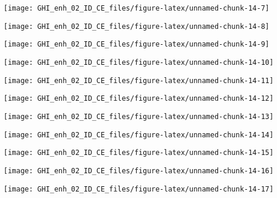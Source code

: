 \documentclass[
  10pt,
  a4paper,oneside]{article}
\begin{document}
\begin{center}\texttt{[image: GHI\_enh\_02\_ID\_CE\_files/figure-latex/unnamed-chunk-14-7]} \end{center}

\begin{center}\texttt{[image: GHI\_enh\_02\_ID\_CE\_files/figure-latex/unnamed-chunk-14-8]} \end{center}

\begin{center}\texttt{[image: GHI\_enh\_02\_ID\_CE\_files/figure-latex/unnamed-chunk-14-9]} \end{center}

\begin{center}\texttt{[image: GHI\_enh\_02\_ID\_CE\_files/figure-latex/unnamed-chunk-14-10]} \end{center}

\begin{center}\texttt{[image: GHI\_enh\_02\_ID\_CE\_files/figure-latex/unnamed-chunk-14-11]} \end{center}

\begin{center}\texttt{[image: GHI\_enh\_02\_ID\_CE\_files/figure-latex/unnamed-chunk-14-12]} \end{center}

\begin{center}\texttt{[image: GHI\_enh\_02\_ID\_CE\_files/figure-latex/unnamed-chunk-14-13]} \end{center}

\begin{center}\texttt{[image: GHI\_enh\_02\_ID\_CE\_files/figure-latex/unnamed-chunk-14-14]} \end{center}

\begin{center}\texttt{[image: GHI\_enh\_02\_ID\_CE\_files/figure-latex/unnamed-chunk-14-15]} \end{center}

\begin{center}\texttt{[image: GHI\_enh\_02\_ID\_CE\_files/figure-latex/unnamed-chunk-14-16]} \end{center}

\begin{center}\texttt{[image: GHI\_enh\_02\_ID\_CE\_files/figure-latex/unnamed-chunk-14-17]} \end{center}
\end{document}
